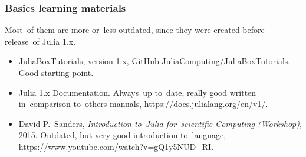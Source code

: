 \documentclass[10pt,t]{beamer}
\begin{document}
\begin{frame}
  \frametitle{Basics learning materials}


  Most~of them are more or~less outdated, since they were created
  before release~of Julia 1.x.
  \begin{itemize}
    \RaggedRight

  \item JuliaBoxTutorials, version 1.x, GitHub
    {JuliaComputing/JuliaBoxTutorials}. Good starting point.

  \item Julia 1.x Documentation. Always~up to~date, really good
    written in~comparison to~others manuals,
    {https://docs.julialang.org/en/v1/}.

  \item David P.~Sanders, \textit{Introduction to~Julia for~scientific
      Computing (Workshop)}, 2015. Outdated, but very good
    introduction to~language,
    {https://www.youtube.com/watch?v=gQ1y5NUD\_RI}.



  \end{itemize}

\end{frame}
\end{document}

